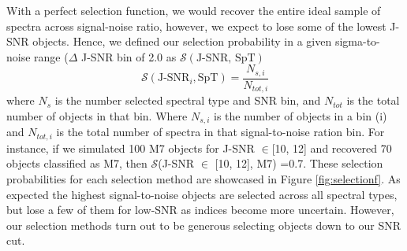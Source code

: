 \documentclass[manuscript]{aastex63}
\begin{document}
With a perfect selection function, we would recover the entire ideal sample of spectra across signal-noise ratio, however, we expect to lose some of the lowest J-SNR objects. Hence, we defined our selection probability in a given sigma-to-noise range ($\Delta$ J-SNR bin of 2.0 as $\mathcal{S}(\text{J-SNR, SpT})$
\begin{equation}\label{equasl}
\mathcal{S}(\text{J-SNR}_i, \text{SpT})= \frac{N_{s, i} }{N_{tot, i}}
\end{equation} where $N_s$ is the number selected spectral type and SNR bin, and $N_{tot}$ is the total number of objects in that bin. Where $N_{s, i}$ is the number of objects in a bin (i) and $N_{tot, i}$ is the total number of spectra in that signal-to-noise ration bin. For instance, if we simulated 100 M7 objects for J-SNR $\in$[10, 12] and recovered 70 objects classified as M7, then $\mathcal{S}$(J-SNR $\in$ [10, 12], M7) =0.7. These selection probabilities for each selection method are showcased in Figure \ref{fig:selectionf}. As expected the highest signal-to-noise objects are selected across all spectral types, but lose a few of them for low-SNR as indices become more uncertain. However, our selection methods turn out to be generous selecting objects down to our SNR cut.
\end{document}
